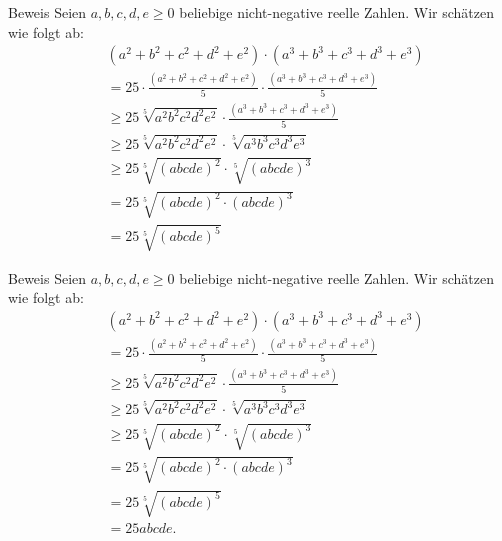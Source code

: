 \documentclass[10pt]{beamer}
\begin{document}
\begin{frame}{Beweis}
    Seien \( a, b, c, d, e \geq 0 \) beliebige nicht-negative reelle Zahlen. Wir schätzen wie folgt ab:
    \begin{align*}
        & \left( a^{2} + b^{2} + c^{2} + d^{2} + e^{2} \right) \cdot \left( a^{3} + b^{3} + c^{3} + d^{3} + e^{3} \right) \\
        & = 25 \cdot \frac{\left( a^{2} + b^{2} + c^{2} + d^{2} + e^{2} \right)}{5} \cdot \frac{\left( a^{3} + b^{3} + c^{3} + d^{3} + e^{3} \right)}{5} \\
        & \geq 25 \sqrt[5]{a^{2} b^{2} c^{2} d^{2} e^{2}} \cdot \frac{\left( a^{3} + b^{3} + c^{3} + d^{3} + e^{3} \right)}{5} \\
        & \geq 25 \sqrt[5]{a^{2} b^{2} c^{2} d^{2} e^{2}} \cdot \sqrt[5]{a^{3} b^{3} c^{3} d^{3} e^{3}} \\
        & \geq 25 \sqrt[5]{\left( a b c d e \right)^{2}} \cdot \sqrt[5]{\left( a b c d e \right)^{3}} \\
        & = 25 \sqrt[5]{\left( a b c d e \right)^{2} \cdot \left( a b c d e \right)^{3}} \\
        & = 25 \sqrt[5]{\left( a b c d e \right)^{5}}
    \end{align*}
\end{frame}



\begin{frame}{Beweis}
    Seien \( a, b, c, d, e \geq 0 \) beliebige nicht-negative reelle Zahlen. Wir schätzen wie folgt ab:
    \begin{align*}
        & \left( a^{2} + b^{2} + c^{2} + d^{2} + e^{2} \right) \cdot \left( a^{3} + b^{3} + c^{3} + d^{3} + e^{3} \right) \\
        & = 25 \cdot \frac{\left( a^{2} + b^{2} + c^{2} + d^{2} + e^{2} \right)}{5} \cdot \frac{\left( a^{3} + b^{3} + c^{3} + d^{3} + e^{3} \right)}{5} \\
        & \geq 25 \sqrt[5]{a^{2} b^{2} c^{2} d^{2} e^{2}} \cdot \frac{\left( a^{3} + b^{3} + c^{3} + d^{3} + e^{3} \right)}{5} \\
        & \geq 25 \sqrt[5]{a^{2} b^{2} c^{2} d^{2} e^{2}} \cdot \sqrt[5]{a^{3} b^{3} c^{3} d^{3} e^{3}} \\
        & \geq 25 \sqrt[5]{\left( a b c d e \right)^{2}} \cdot \sqrt[5]{\left( a b c d e \right)^{3}} \\
        & = 25 \sqrt[5]{\left( a b c d e \right)^{2} \cdot \left( a b c d e \right)^{3}} \\
        & = 25 \sqrt[5]{\left( a b c d e \right)^{5}} \\
        & = 25 a b c d e.
    \end{align*}
\end{frame}
\end{document}
